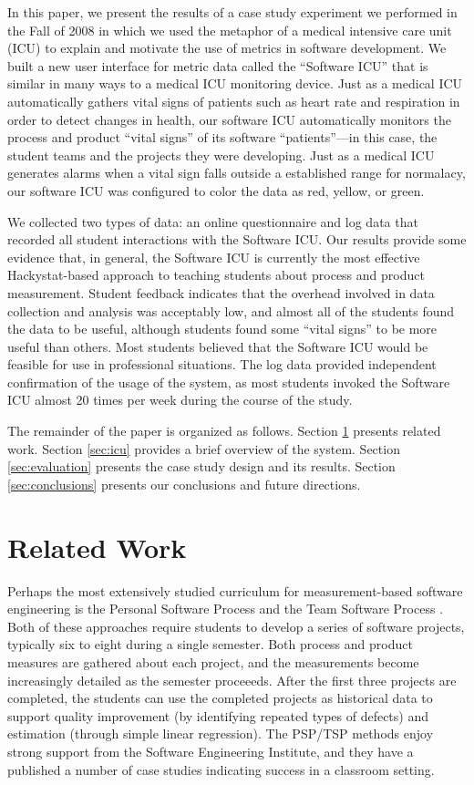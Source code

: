 \documentclass{acm_proc_article-sp}
\begin{document}
In this paper, we present the results of a case study experiment we
performed in the Fall of 2008 in which we used the metaphor of a medical
intensive care unit (ICU) to explain and motivate the use of metrics in
software development.  We built a new user interface for metric data called
the ``Software ICU'' that is similar in many ways to a medical ICU
monitoring device.  Just as a medical ICU automatically gathers vital signs
of patients such as heart rate and respiration in order to detect changes
in health, our software ICU automatically monitors the process and product
``vital signs'' of its software ``patients''---in this case, the student
teams and the projects they were developing.  Just as a medical ICU
generates alarms when a vital sign falls outside a established range for
normalacy, our software ICU was configured to color the data as red,
yellow, or green.

We collected two types of data: an online questionnaire and log data that
recorded all student interactions with the Software ICU.  Our results
provide some evidence that, in general, the Software ICU is currently the
most effective Hackystat-based approach to teaching students about process
and product measurement.  Student feedback indicates that the overhead
involved in data collection and analysis was acceptably low, and almost all
of the students found the data to be useful, although students found some
``vital signs'' to be more useful than others. Most students believed that
the Software ICU would be feasible for use in professional situations.  The
log data provided independent confirmation of the usage of the system, as
most students invoked the Software ICU almost 20 times per week during the
course of the study.

The remainder of the paper is organized as follows.  Section
\ref{sec:related} presents related work.  Section \ref{sec:icu} provides a
brief overview of the system. Section \ref{sec:evaluation} presents the
case study design and its results.  Section \ref{sec:conclusions} presents
our conclusions and future directions.

\section {Related Work}
\label{sec:related}

Perhaps the most extensively studied curriculum for measurement-based
software engineering is the Personal Software Process \cite{Humphrey95} and
the Team Software Process \cite{Humphrey00}.  Both of these approaches
require students to develop a series of software projects, typically six to
eight during a single semester.  Both process and product measures are
gathered about each project, and the measurements become increasingly
detailed as the semester proceeeds. After the first three projects are
completed, the students can use the completed projects as historical data
to support quality improvement (by identifying repeated types of defects)
and estimation (through simple linear regression).  The PSP/TSP methods
enjoy strong support from the Software Engineering Institute, and they have
a published a number of case studies indicating success in a classroom setting. 
\end{document}
